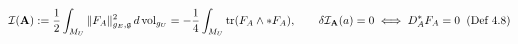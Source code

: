 \documentclass[preview]{standalone}
\begin{document}
\begin{align*}
\special{dvisvgm:raw <g id='unique000'>}\mathcal{I}(\mathbf{A}) := \frac{1}{2}\int_{M_U} \|F_A\|_{g_E,\mathfrak{g}}^2\,d\operatorname{vol}_{g_U} = -\frac{1}{4}\int_{M_U} \operatorname{tr}(F_A\wedge *F_A), \qquad \delta\mathcal{I}_{\mathbf{A}}(a) = 0 \;\Longleftrightarrow\; D_A^* F_A = 0\;\;(\text{Def 4.8})\special{dvisvgm:raw </g>}
\end{align*}
\end{document}
